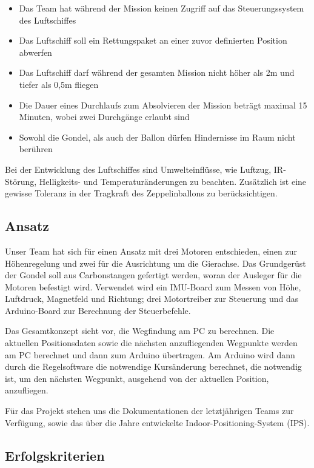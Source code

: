 \documentclass[lang=ngerman,inputenc=utf8,fontsize=10pt]{ldvarticle}
\begin{document}
\begin{itemize}
\item Das Team hat während der Mission keinen Zugriff auf das Steuerungssystem des Luftschiffes 
\item Das Luftschiff soll ein Rettungspaket an einer zuvor definierten Position abwerfen
\item Das Luftschiff darf während der gesamten Mission nicht höher als 2m und tiefer als 0,5m fliegen
\item Die Dauer eines Durchlaufs zum Absolvieren der Mission beträgt maximal 15 Minuten, wobei zwei Durchgänge erlaubt sind
\item Sowohl die Gondel, als auch der Ballon dürfen Hindernisse im Raum nicht berühren
\end{itemize}

Bei der Entwicklung des Luftschiffes sind Umwelteinflüsse, wie Luftzug, IR-Störung, Helligkeits- und Temperaturänderungen zu beachten. Zusätzlich ist eine gewisse Toleranz in der Tragkraft des Zeppelinballons zu berücksichtigen.

\subsection*{Ansatz}
Unser Team hat sich für einen Ansatz mit drei Motoren entschieden, einen zur Höhenregelung und zwei für die Ausrichtung um die Gierachse. Das Grundgerüst der Gondel soll aus Carbonstangen gefertigt werden, woran der Ausleger für die Motoren befestigt wird. Verwendet wird ein IMU-Board zum Messen von Höhe, Luftdruck, Magnetfeld und Richtung; drei Motortreiber zur Steuerung und das Arduino-Board zur Berechnung der Steuerbefehle.


Das Gesamtkonzept sieht vor, die Wegfindung am PC zu berechnen. Die aktuellen Positionsdaten sowie die nächsten anzufliegenden Wegpunkte werden am PC berechnet und dann zum Arduino übertragen. Am Arduino wird dann durch die Regelsoftware die notwendige Kursänderung berechnet, die notwendig ist, um den nächsten Wegpunkt, ausgehend von der aktuellen Position, anzufliegen.


Für das Projekt stehen uns die Dokumentationen der letztjährigen Teams zur Verfügung, sowie das über die Jahre entwickelte Indoor-Positioning-System (IPS).


\subsection*{Erfolgskriterien}
\end{document}
